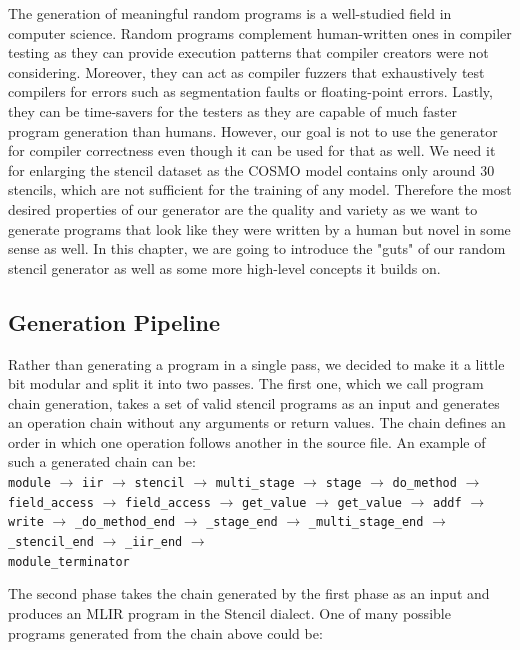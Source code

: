 \documentclass[sigplan,\review anonymous]{acmart}
\begin{document}
The generation of meaningful random programs is a well-studied field in
computer science. Random programs complement human-written ones in compiler
testing as they can provide execution patterns that compiler creators were not
considering. Moreover, they can act as compiler fuzzers that exhaustively test
compilers for errors such as segmentation faults or floating-point errors.
Lastly, they can be time-savers for the testers as they are capable of much
faster program generation than humans. However, our goal is not to use the
generator for compiler correctness even though it can be used for that as
well. We need it for enlarging the stencil dataset as the COSMO model contains
only around 30 stencils, which are not sufficient for the training of any
model. Therefore the most desired properties of our generator are the quality
and variety as we want to generate programs that look like they were written
by a human but novel in some sense as well. In this chapter, we are going to
introduce the "guts" of our random stencil generator as well as some more
high-level concepts it builds on. 

\subsection{Generation Pipeline}
Rather than generating a program in a single pass, we decided to make it a
little bit modular and split it into two passes. The first one, which we call
program chain generation, takes a set of valid stencil programs as an input
and generates an operation chain without any arguments or return values. The
chain defines an order in which one operation follows another in the source
file. An example of such a generated chain can be:\\
\label{chain}
\texttt{module} $\rightarrow$
\texttt{iir} $\rightarrow$
\texttt{stencil} $\rightarrow$
\texttt{multi\_stage} $\rightarrow$
\texttt{stage} $\rightarrow$
\texttt{do\_method} $\rightarrow$
\texttt{field\_access} $\rightarrow$
\texttt{field\_access} $\rightarrow$
\texttt{get\_value} $\rightarrow$
\texttt{get\_value} $\rightarrow$
\texttt{addf} $\rightarrow$
\texttt{write} $\rightarrow$
\texttt{\_do\_method\_end} $\rightarrow$
\texttt{\_stage\_end} $\rightarrow$
\texttt{\_multi\_stage\_end} $\rightarrow$
\texttt{\_stencil\_end} $\rightarrow$
\texttt{\_iir\_end} $\rightarrow$\\
\texttt{module\_terminator}

\noindent The second phase takes the chain generated by the first phase as
an input and produces an MLIR program in the Stencil dialect.
One of many possible programs generated from the chain above could be:
\end{document}
